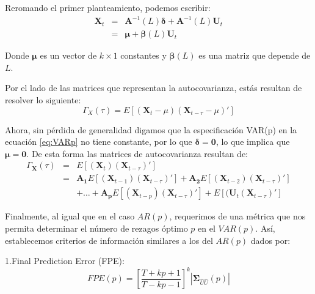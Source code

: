 \documentclass[
]{book}
\begin{document}
Reromando el primer planteamiento, podemos escribir:
\begin{eqnarray}
    \mathbf{X}_t & = & \mathbf{A}^{-1}(L) \boldsymbol{\delta} + \mathbf{A}^{-1}(L) \mathbf{U}_t \nonumber \\
    & = & \boldsymbol{\mu} + \boldsymbol{\beta}(L) \mathbf{U}_t
    \label{eq:VARMAq}
\end{eqnarray}

Donde \(\boldsymbol{\mu}\) es un vector de \(k \times 1\) constantes y \(\boldsymbol{\beta}(L)\) es una matriz que depende de \(L\).

Por el lado de las matrices que representan la autocovarianza, estás resultan de resolver lo siguiente:
\begin{equation}
    \Gamma_X(\tau) = E[(\mathbf{X}_t - \mu)(\mathbf{X}_{t-\tau} - \mu)'] 
\end{equation}

Ahora, sin pérdida de generalidad digamos que la especificación VAR(p) en la ecuación \eqref{eq:VARp} no tiene constante, por lo que \(\boldsymbol{\delta} = \mathbf{0}\), lo que implica que \(\boldsymbol{\mu} = \mathbf{0}\). De esta forma las matrices de autocovarianza resultan de:
\begin{eqnarray*}
    \Gamma_{\mathbf{X}}(\tau) & = & E[(\mathbf{X}_t)(\mathbf{X}_{t-\tau})'] \\
    & = & \mathbf{A_1} E[(\mathbf{X}_{t-1})(\mathbf{X}_{t-\tau})'] + \mathbf{A_2} E[(\mathbf{X}_{t-2})(\mathbf{X}_{t-\tau})'] \\
    &   & + \ldots + \mathbf{A_p} E[(\mathbf{X}_{t-p})(\mathbf{X}_{t-\tau})'] + E[(\mathbf{U}_t(\mathbf{X}_{t-\tau})']
\end{eqnarray*}

Finalmente, al igual que en el caso \(AR(p)\), requerimos de una métrica que nos permita determinar el número de rezagos óptimo \(p\) en el \(VAR(p)\). Así, establecemos criterios de información similares a los del \(AR(p)\) dados por:

1.Final Prediction Error (FPE):
\begin{equation}
        FPE(p) = \left[ \frac{T + kp + 1}{T - kp - 1} \right]^k |\mathbf{\Sigma}_{\hat{U}\hat{U}}(p)|
        \end{equation}
\end{document}
